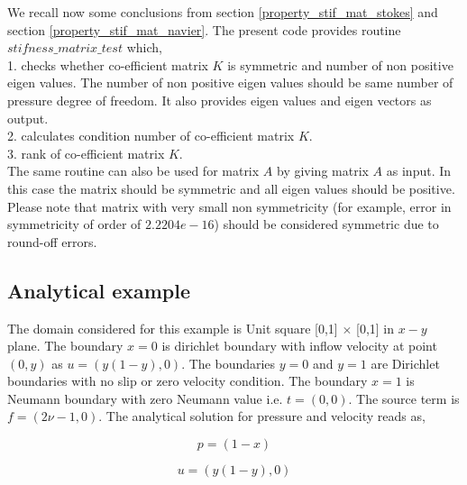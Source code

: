 \documentclass[a4paper,12pt]{book}
\begin{document}
We recall now some conclusions from section \ref{property_stif_mat_stokes} and section \ref{property_stif_mat_navier}. The present code provides routine $stifness\_matrix\_test$ which, \\

1. checks whether co-efficient matrix $K$ is symmetric and number of non positive eigen values. The number of non positive eigen values should be same number of pressure degree of freedom. It also provides eigen values and eigen vectors as output.\\

2. calculates condition number of co-efficient matrix $K$. \\

3. rank of co-efficient matrix $K$.\\

The same routine can also be used for matrix $A$ by giving matrix $A$ as input. In this case the matrix should be symmetric and all eigen values should be positive.\\

Please note that matrix with very small non symmetricity (for example, error in symmetricity of order of $2.2204e-16$) should be considered symmetric due to round-off errors.

\subsection{Analytical example}

The domain considered for this example is Unit square [0,1] $\times$ [0,1] in $x-y$ plane. 
The boundary ${x=0}$ is dirichlet boundary with inflow velocity at point $(0,y)$ as $u = (y(1-y), 0)$. The boundaries ${y = 0}$ and ${y = 1}$ are Dirichlet boundaries with no slip or zero velocity condition. The boundary ${x = 1}$ is Neumann boundary with zero Neumann value i.e. $t = (0, 0)$. The source term is $f = (2 \nu - 1, 0)$. The analytical solution for pressure and velocity reads as,

\begin{center}

\begin{equation}
p = (1 - x)
\end{equation}

\begin{equation} 
 u = (y(1-y), 0)
\end{equation}

\end{center}
\end{document}
